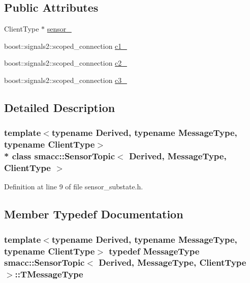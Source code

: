 \subsection*{Public Attributes}
\begin{DoxyCompactItemize}
\item 
Client\+Type $\ast$ \hyperlink{classsmacc_1_1SensorTopic_a9a4d3eab86b06e9470f61e65c2e46321}{sensor\+\_\+}
\item 
boost\+::signals2\+::scoped\+\_\+connection \hyperlink{classsmacc_1_1SensorTopic_a26de37f4a91948deb46498183fb83b2f}{c1\+\_\+}
\item 
boost\+::signals2\+::scoped\+\_\+connection \hyperlink{classsmacc_1_1SensorTopic_a1af6969425c827ae3e00121ba9da6a57}{c2\+\_\+}
\item 
boost\+::signals2\+::scoped\+\_\+connection \hyperlink{classsmacc_1_1SensorTopic_ab204e71b44588ca208e2986e56dd3b87}{c3\+\_\+}
\end{DoxyCompactItemize}


\subsection{Detailed Description}
\subsubsection*{template$<$typename Derived, typename Message\+Type, typename Client\+Type$>$\\*
class smacc\+::\+Sensor\+Topic$<$ Derived, Message\+Type, Client\+Type $>$}



Definition at line 9 of file sensor\+\_\+substate.\+h.



\subsection{Member Typedef Documentation}
\subsubsection[{\texorpdfstring{T\+Message\+Type}{TMessageType}}]{\setlength{\rightskip}{0pt plus 5cm}template$<$typename Derived, typename Message\+Type, typename Client\+Type$>$ typedef Message\+Type {\bf smacc\+::\+Sensor\+Topic}$<$ Derived, Message\+Type, Client\+Type $>$\+::{\bf T\+Message\+Type}}\hypertarget{classsmacc_1_1SensorTopic_adbe35371b4599a2705deeb76a11cb1ea}{}\label{classsmacc_1_1SensorTopic_adbe35371b4599a2705deeb76a11cb1ea}


